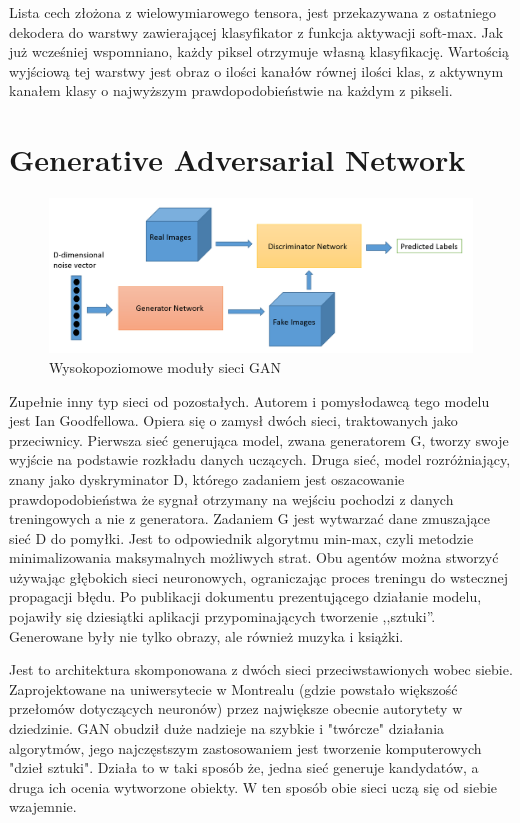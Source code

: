 \documentclass[12pt,a4paper,twoside,titlepage,openright]{book}
\begin{document}
Lista cech złożona z wielowymiarowego tensora, jest przekazywana z ostatniego dekodera do warstwy zawierającej klasyfikator z funkcja aktywacji soft-max. Jak już wcześniej wspomniano, każdy piksel otrzymuje własną klasyfikację. Wartością wyjściową tej warstwy jest obraz o ilości kanałów równej ilości klas, z aktywnym kanałem klasy o najwyższym prawdopodobieństwie na każdym z pikseli. \cite{DBLP:journals/corr/BadrinarayananH15}

\section{Generative Adversarial Network}
\begin{figure}[ht]
	\centering
			\includegraphics[resolution=100,scale=0.36]{GAN.png}
		\caption{Wysokopoziomowe moduły sieci GAN}
\end{figure}

Zupełnie inny typ sieci od pozostałych. Autorem i pomysłodawcą tego modelu jest Ian Goodfellowa. Opiera się o zamysł dwóch sieci, traktowanych jako przeciwnicy. Pierwsza sieć generująca model, zwana generatorem G, tworzy swoje wyjście na podstawie rozkładu danych uczących. Druga sieć, model rozróżniający, znany jako dyskryminator D, którego zadaniem jest oszacowanie prawdopodobieństwa że sygnał otrzymany na wejściu pochodzi z danych treningowych a nie z generatora. Zadaniem G jest wytwarzać dane zmuszające sieć D do pomyłki. Jest to odpowiednik algorytmu min-max, czyli metodzie minimalizowania maksymalnych możliwych strat. Obu agentów można stworzyć używając głębokich sieci neuronowych, ograniczając proces treningu do wstecznej propagacji błędu. Po publikacji dokumentu prezentującego działanie modelu, pojawiły się dziesiątki aplikacji przypominających tworzenie ,,sztuki''. Generowane były nie tylko obrazy, ale również muzyka i książki. 

Jest to architektura skomponowana z dwóch sieci przeciwstawionych wobec siebie. Zaprojektowane na uniwersytecie w Montrealu (gdzie powstało większość przełomów dotyczących neuronów) przez największe obecnie autorytety w dziedzinie. GAN obudził duże nadzieje na szybkie i "twórcze" działania algorytmów, jego najczęstszym zastosowaniem jest tworzenie komputerowych "dzieł sztuki". Działa to w taki sposób że, jedna sieć generuje kandydatów, a druga ich ocenia wytworzone obiekty. W ten sposób obie sieci uczą się od siebie wzajemnie. \cite{NIPS2014_5423}
\end{document}
